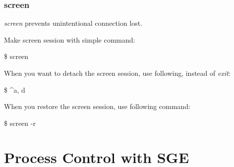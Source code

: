 \documentclass{beamer}
\begin{document}
	\begin{frame}
		\frametitle{screen}
		\textit{screen} prevents unintentional connection lost. 
		
		Make screen session with simple command:
		\begin{example}
			\$ screen
		\end{example}
	
		When you want to detach the screen session, use following, instead of \textit{exit}:
		\begin{example}
			\$ \^{}a, d
		\end{example}
	
		When you restore the screen session, use following command:
		\begin{example}
			\$ screen -r
		\end{example}
	\end{frame}
	
	\section{Process Control with SGE}
\end{document}
